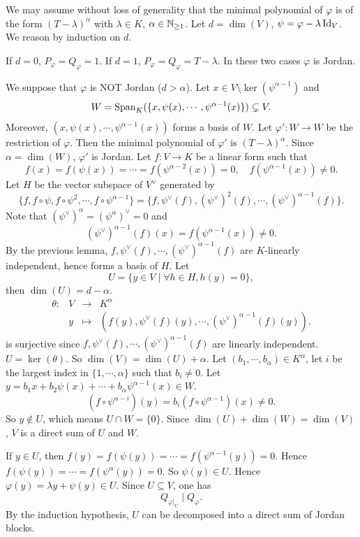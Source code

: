 \begin{proofenv}
    We may assume without loss of generality that the minimal polynomial of $\varphi$ is of the form $(T - \lambda)^\alpha$ with $\lambda \in K$, $\alpha \in \mathbb{N}_{\ge 1}$.
    Let $d = \dim(V)$, $\psi = \varphi - \lambda \operatorname{\mathrm{Id}}_{V}$.
    We reason by induction on $d$.

    \quad If $d = 0$, $P_{\varphi} = Q_{\varphi} = 1$.
    If $d = 1$, $P_{\varphi} = Q_{\varphi} = T - \lambda$. In these two cases $\varphi$ is Jordan.

    \quad We suppose that $\varphi$ is NOT Jordan ($d > \alpha$).
    Let $x \in V \setminus \ker(\psi^{\alpha - 1})$ and 
    $$W = \operatorname{\mathrm{Span}}_{K}(\{x,\psi(x),\cdots,\psi^{\alpha - 1}(x)\}) \subsetneq V.$$
    Moreover, $(x,\psi(x),\cdots,\psi^{\alpha-1}(x))$ forms a basis of $W$.
    Let $\varphi':W\rightarrow W$ be the restriction of $\varphi$.
    Then the minimal polynomial of $\varphi'$ is $(T - \lambda)^\alpha$.
    Since $\alpha = \dim(W)$, $\varphi'$ is Jordan.
    Let $f: V \rightarrow K$ be a linear form such that
    $$f(x) = f(\psi(x)) = \cdots = f(\psi^{\alpha - 2}(x)) = 0, \quad f(\psi^{\alpha - 1}(x)) \neq 0.$$
    Let $H$ be the vector subspace of $V^\vee$ generated by 
    $$\{f,f\circ \psi , f \circ \psi^2 ,\cdots, f \circ \psi^{\alpha - 1}\} = \{f, \psi^\vee (f), (\psi^\vee)^2 (f),\cdots, (\psi^\vee)^{\alpha - 1}(f)\}.$$
    Note that $(\psi^\vee)^\alpha = (\psi^\alpha)^\vee = 0$ and 
    $$(\psi^\vee)^{\alpha - 1}(f)(x) = f(\psi^{\alpha-1}(x)) \neq 0.$$
    By the previous lemma, $f,\psi^\vee(f),\cdots,(\psi^\vee)^{\alpha - 1}(f)$ are $K$-linearly independent,
    hence forms a basis of $H$.
    Let
    $$U = \{y \in V \mid \forall h \in H, h(y) = 0\},$$
    then $\dim(U) = d - \alpha$.
    $$\begin{array}{rrcl}
        \theta : & V & \longrightarrow & K^\alpha\\
        & y & \longmapsto & (f(y), \psi^\vee(f)(y), \cdots, (\psi^\vee)^{\alpha - 1}(f)(y)).
    \end{array}$$
    is surjective since $f, \psi^\vee(f), \cdots, (\psi^\vee)^{\alpha - 1}(f)$ are linearly independent.
    $U = \ker(\theta)$.
    So $\dim(V) = \dim(U) + \alpha$.
    Let $(b_1,\cdots,b_\alpha) \in K^\alpha$, let $i$ be the largest index in $\{1,\cdots,\alpha\}$ such that $b_i \neq 0$.
    Let $y = b_1 x + b_2 \psi(x) + \cdots + b_{\alpha}\psi^{\alpha-1}(x) \in W$.
    $$(f \circ \psi^{\alpha - i})(y) = b_i (f \circ \psi^{\alpha - 1})(x) \neq 0.$$
    So $y \notin U$, which means $U \cap W = \{0\}$.
    Since $\dim(U) + \dim (W) = \dim (V)$, $V$ is a direct sum of $U$ and $W$.

    If $y \in U$, then $f(y) = f(\psi(y)) = \cdots = f (\psi^{\alpha - 1}(y)) = 0$.
    Hence $f(\psi(y)) = \cdots = f (\psi^{\alpha}(y)) = 0$.
    So $\psi(y) \in U$.
    Hence $\varphi(y) = \lambda y + \psi(y) \in U$.
    Since $U \subseteq V$, one has
    $$Q_{\varphi|_{U}} \mid Q_{\varphi}.$$
    By the induction hypothesis, $U$ can be decomposed into a direct sum of Jordan blocks.
\end{proofenv}

